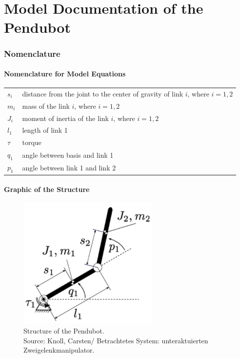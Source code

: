 \documentclass[10pt,a4paper]{article}
\begin{document}
	\part*{Model Documentation of the \\ Pendubot} %
	
	
	\section{Nomenclature} %
	\subsection{Nomenclature for Model Equations} %
	
	\begin{tabular}{ll}
		$s_i$ & distance from the joint to the center of gravity of link $i$, where $i = 1,2$ \\
		$m_i$ & mass of the link $i$, where $i = 1,2$ \\
		$J_i$ & moment of inertia of the link $i$, where $i = 1,2$ \\
		$l_1$ & length of link 1 \\
		$\tau$ & torque \\
		$q_1$ & angle between basis and link 1\\
		$p_1$ & angle between link 1 and link 2\\
		
	\end{tabular}
	 
	
	\subsection{Graphic of the Structure}	
	\begin{figure}[H]
		\centering
		\captionsetup{justification=centering, margin=1cm}
		\includegraphics[width=70mm]{two_manipulator.pdf}
		\caption{Structure of the Pendubot. \\ \footnotesize{Source: Knoll, Carsten/ Betrachtetes System: unteraktuierten Zweigelenkmanipulator.}}
	\end{figure}
	
\end{document}
